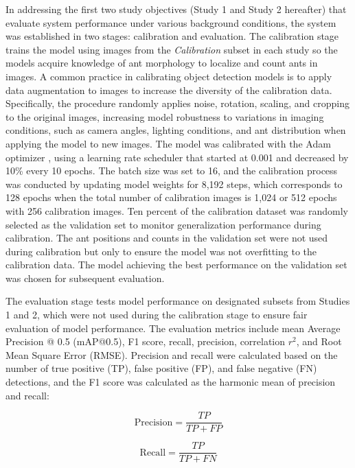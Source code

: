 In addressing the first two study objectives (Study 1 and Study 2 hereafter) that evaluate system performance under various background conditions, the system was established in two stages: calibration and evaluation. The calibration stage trains the model using images from the \textit{Calibration} subset in each study so the models acquire knowledge of ant morphology to localize and count ants in images. A common practice in calibrating object detection models is to apply data augmentation to images to increase the diversity of the calibration data. Specifically, the procedure randomly applies noise, rotation, scaling, and cropping to the original images, increasing model robustness to variations in imaging conditions, such as camera angles, lighting conditions, and ant distribution when applying the model to new images. The model was calibrated with the Adam optimizer \cite{kingma_adam_2017}, using a learning rate scheduler that started at 0.001 and decreased by 10\% every 10 epochs. The batch size was set to 16, and the calibration process was conducted by updating model weights for 8,192 steps, which corresponds to 128 epochs when the total number of calibration images is 1,024 or 512 epochs with 256 calibration images. Ten percent of the calibration dataset was randomly selected as the validation set to monitor generalization performance during calibration. The ant positions and counts in the validation set were not used during calibration but only to ensure the model was not overfitting to the calibration data. The model achieving the best performance on the validation set was chosen for subsequent evaluation. 

The evaluation stage tests model performance on designated subsets from Studies 1 and 2, which were not used during the calibration stage to ensure fair evaluation of model performance. The evaluation metrics include mean Average Precision @ 0.5 (mAP@0.5), F1 score, recall, precision, correlation $r^2$, and Root Mean Square Error (RMSE). Precision and recall were calculated based on the number of true positive (TP), false positive (FP), and false negative (FN) detections, and the F1 score was calculated as the harmonic mean of precision and recall:

\begin{equation}
\text{Precision} = \frac{TP}{TP + FP}
\end{equation}

\begin{equation}
\text{Recall} = \frac{TP}{TP + FN}
\end{equation}

